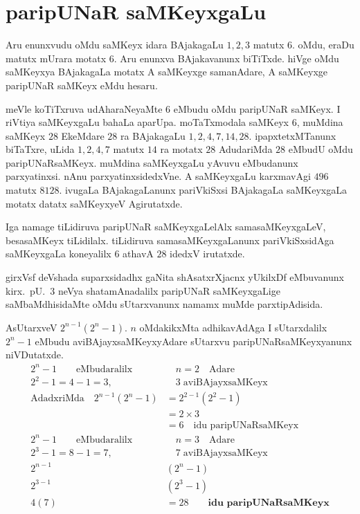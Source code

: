 \chapter{paripUNaR saMKeyxgaLu}

\vskip -20pt

Aru enunxvudu oMdu saMKeyx idara BAjakagaLu $1,2,3$ matutx $6$. oMdu, eraDu matutx mUrara motatx $6$. 
Aru enunxva BAjakavanunx biTiTxde. hiVge oMdu saMKeyxya BAjakagaLa motatx A saMKeyxge samanAdare, A saMKeyxge paripUNaR saMKeyx eMdu hesaru.

meVle koTiTxruva  udAharaNeyaMte $6$ eMbudu oMdu paripUNaR saMKeyx. I riVtiya saMKeyxgaLu bahaLa aparUpa.  moTaTxmodala saMKeyx $6$, muMdina saMKeyx $28$ EkeMdare $28$ ra BAjakagaLu $1,2,4,7,14,28$. ipapxtetxMTanunx biTaTxre, uLida $1,2,4,7$ matutx $14$ ra motatx $28$ AdudariMda $28$ eMbudU oMdu paripUNaRsaMKeyx. muMdina saMKeyxgaLu yAvuvu eMbudanunx parxyatinxsi. nAnu parxyatinxsidedxVne. A saMKeyxgaLu karxmavAgi $496$ matutx $8128$. ivugaLa BAjakagaLanunx pariVkiSxsi BAjakagaLa saMKeyxgaLa motatx datatx saMKeyxyeV Agirutatxde.  

Iga namage tiLidiruva paripUNaR saMKeyxgaLelAlx samasaMKeyxgaLeV, besasaMKeyx tiLidilalx. tiLidiruva samasaMKeyxgaLanunx pariVkiSxsidAga saMKeyxgaLa koneyalilx $6$ athavA $28$ idedxV irutatxde.

girxVsf deVshada suparxsidadhx gaNita shAsatxrXjacnx yUkilxDf eMbuvanunx kirx.~pU.\ $3$ neVya shatamAnadalilx paripUNaR saMKeyxgaLige saMbaMdhisidaMte oMdu sUtarxvanunx namamx muMde parxtipAdisida.

AsUtarxveV $2^{n-1}(2^{n}-1)$. $n$ oMdakikxMta adhikavAdAga I sUtarxdalilx $2^{n}-1$ eMbudu aviBAjayxsaMKeyxyAdare sUtarxvu paripUNaRsaMKeyxyanunx niVDutatxde. 
\begin{align*}
2^{n}-1 \qquad\text{eMbudaralilx}&  \quad n=2 \quad\text{Adare}\\
2^{2}-1 = 4-1 =3, &\quad 3\;\text{aviBAjayxsaMKeyx}\\
\text{AdadxriMda}\quad 2^{n-1}(2^{n}-1) &= 2^{2-1}(2^{2}-1)\\
&=2\times 3\\
&=6 \quad \text{idu paripUNaRsaMKeyx}\\[0.1cm]%
2^{n}-1 \qquad\text{eMbudaralilx} &\quad n=3 \quad\text{Adare}\\
2^{3}-1 = 8-1 = 7, &\quad 7\; \text{aviBAjayxsaMKeyx}\\
2^{n-1}&(2^{n}-1)\\
2^{3-1}&(2^{3}-1)\\
4(7) &= 28 \qquad\textbf{idu paripUNaRsaMKeyx}
\end{align*}

